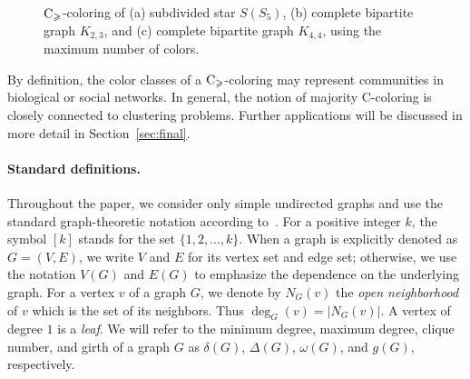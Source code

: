 \documentclass{article}
\theoremstyle{definition}
\newcommand{\mc}{\overline{\chi}_{\geqslant}}
\newcommand{\cg}{{\rm C}_{\geqslant}}
\newcommand{\cP}{{\cal P}}
\newcommand{\cs}[1]{{\textcolor{blue}{#1}}}
\begin{document}
\begin{figure}[htb]
\begin{minipage}[c]{0.3\textwidth}
\end{minipage}
\caption{$\cg$-coloring of (a) subdivided star $S(S_5)$, (b) complete bipartite graph $K_{2,3}$, and (c) complete bipartite graph $K_{4,4}$, using the maximum number of colors.}
\label{fig:ex_substar_cubic}
\end{figure}

\medskip

By definition, the color classes of a $\cg$-coloring may represent communities in biological or social networks. In general, the notion of majority C-coloring is closely connected to clustering problems. Further applications will be discussed in more detail in Section~\ref{sec:final}.

\paragraph{Standard definitions.} 
Throughout the paper, we consider only simple undirected graphs and use the standard graph-theoretic notation according to~\cite{West-book}.
For a positive integer $k$, the symbol $[k]$ stands for the set $\{1,2,\ldots,k\}$.
When a graph is explicitly denoted as $G=(V,E)$, we write $V$ and $E$ for its vertex set and edge set;
otherwise, we use the notation $V(G)$ and $E(G)$ to emphasize the dependence on the underlying graph.
For a vertex $v$ of a graph $G$, we denote by $N_G(v)$ the {\it open neighborhood} of $v$  which is the set of its neighbors. Thus $\deg_G(v)=|N_G(v)|$. A vertex of degree $1$ is a {\it leaf}. %
We will refer to the minimum degree, maximum degree, clique number, and girth of a graph $G$ as $\delta(G)$, $\Delta(G)$, $\omega(G)$, and $g(G)$, respectively.
\end{document}
